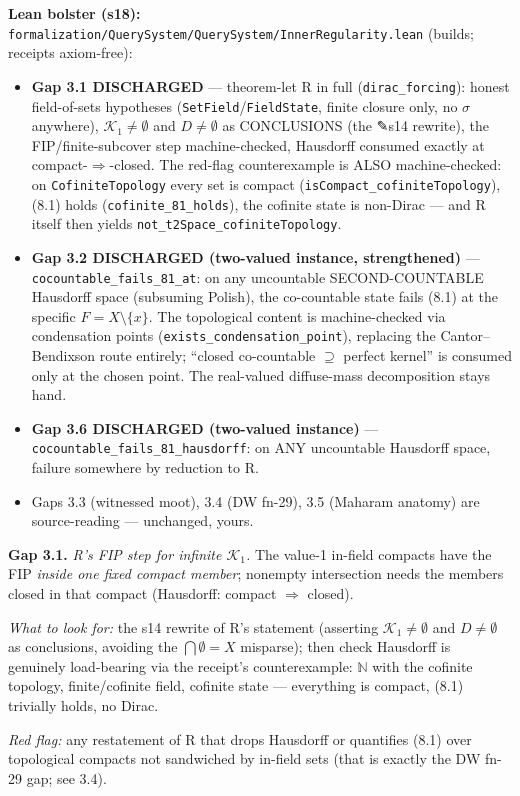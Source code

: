 \documentclass[11pt]{article}
\newcommand{\file}[1]{\texttt{\small #1}}
\newcommand{\gap}[1]{\medskip\noindent\textbf{Gap #1.}}
\newcommand{\lookfor}{\par\smallskip\noindent\emph{What to look for:} }
\newcommand{\redflag}{\par\smallskip\noindent\emph{Red flag:} }
\begin{document}
\smallskip\noindent\textbf{Lean bolster (s18):}
\file{formalization/QuerySystem/QuerySystem/InnerRegularity.lean}
(builds; receipts axiom-free):
\begin{itemize}[leftmargin=2em]
\item \textbf{Gap 3.1 DISCHARGED} --- theorem-let R in full
  (\texttt{dirac\_forcing}): honest field-of-sets hypotheses
  (\texttt{SetField}/\texttt{FieldState}, finite closure only, no
  $\sigma$ anywhere), $\mathcal K_1 \neq \emptyset$ and $D \neq
  \emptyset$ as CONCLUSIONS (the ✎s14 rewrite), the FIP/finite-subcover
  step machine-checked, Hausdorff consumed exactly at
  compact-$\Rightarrow$-closed. The red-flag counterexample is ALSO
  machine-checked: on \texttt{CofiniteTopology} every set is compact
  (\texttt{isCompact\_cofiniteTopology}), (8.1) holds
  (\texttt{cofinite\_81\_holds}), the cofinite state is non-Dirac ---
  and R itself then yields \texttt{not\_t2Space\_cofiniteTopology}.
\item \textbf{Gap 3.2 DISCHARGED (two-valued instance, strengthened)}
  --- \texttt{cocountable\_fails\_81\_at}: on any uncountable
  SECOND-COUNTABLE Hausdorff space (subsuming Polish), the co-countable
  state fails (8.1) at the specific $F = X \setminus \{x\}$. The
  topological content is machine-checked via condensation points
  (\texttt{exists\_condensation\_point}), replacing the
  Cantor--Bendixson route entirely; ``closed co-countable $\supseteq$
  perfect kernel'' is consumed only at the chosen point. The
  real-valued diffuse-mass decomposition stays hand.
\item \textbf{Gap 3.6 DISCHARGED (two-valued instance)} ---
  \texttt{cocountable\_fails\_81\_hausdorff}: on ANY uncountable
  Hausdorff space, failure somewhere by reduction to R.
\item Gaps 3.3 (witnessed moot), 3.4 (DW fn-29), 3.5 (Maharam anatomy)
  are source-reading --- unchanged, yours.
\end{itemize}

\gap{3.1} \emph{R's FIP step for infinite $\mathcal K_1$.} The
value-1 in-field compacts have the FIP \emph{inside one fixed compact
member}; nonempty intersection needs the members closed in that
compact (Hausdorff: compact $\Rightarrow$ closed).
\lookfor the s14 rewrite of R's statement (asserting $\mathcal K_1
\neq \emptyset$ and $D \neq \emptyset$ as conclusions, avoiding the
$\bigcap \emptyset = X$ misparse); then check Hausdorff is genuinely
load-bearing via the receipt's counterexample: $\mathbb N$ with the
cofinite topology, finite/cofinite field, cofinite state ---
everything is compact, (8.1) trivially holds, no Dirac.
\redflag any restatement of R that drops Hausdorff or quantifies
(8.1) over topological compacts not sandwiched by in-field sets
(that is exactly the DW fn-29 gap; see 3.4).
\end{document}

